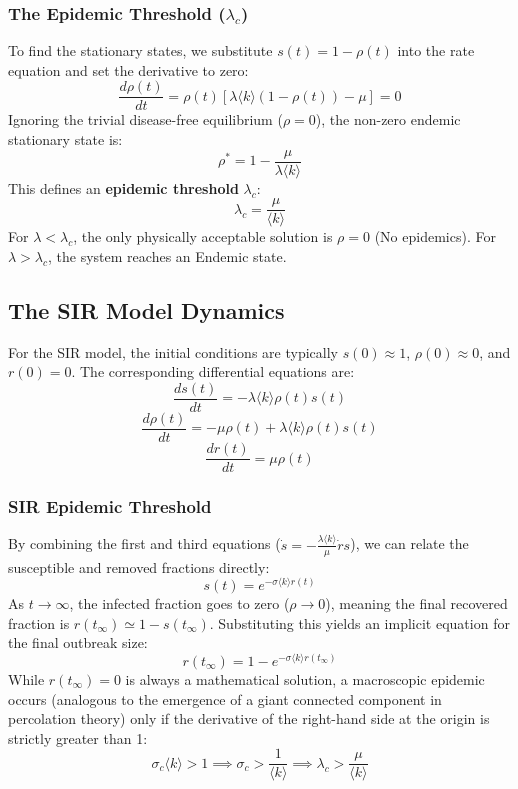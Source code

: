 \subsubsection{The Epidemic Threshold (\(\lambda_c\))}

To find the stationary states, we substitute \(s(t) = 1 - \rho(t)\) into the rate equation and set the derivative to zero:
\[
    \frac{d\rho(t)}{dt} = \rho(t) \left[ \lambda \langle k \rangle (1 - \rho(t)) - \mu \right] = 0
\]
Ignoring the trivial disease-free equilibrium (\(\rho = 0\)), the non-zero endemic stationary state is:
\[
    \rho^* = 1 - \frac{\mu}{\lambda \langle k \rangle}
\]
This defines an \textbf{epidemic threshold} \(\lambda_c\):
\[
    \lambda_c = \frac{\mu}{\langle k \rangle}
\]
For \(\lambda < \lambda_c\), the only physically acceptable solution is \(\rho = 0\) (No epidemics). For \(\lambda > \lambda_c\), the system reaches an Endemic state.

\subsection{The SIR Model Dynamics}
\label{subsec:sir_dynamics}


For the SIR model, the initial conditions are typically \(s(0) \approx 1\), \(\rho(0) \approx 0\), and \(r(0) = 0\). The corresponding differential equations are:
\[
    \frac{ds(t)}{dt} = -\lambda \langle k \rangle \rho(t) s(t)
\]
\[
    \frac{d\rho(t)}{dt} = -\mu \rho(t) + \lambda \langle k \rangle \rho(t) s(t)
\]
\[
    \frac{dr(t)}{dt} = \mu \rho(t)
\]

\subsubsection{SIR Epidemic Threshold}

By combining the first and third equations (\(\dot{s} = -\frac{\lambda \langle k \rangle}{\mu} \dot{r} s\)), we can relate the susceptible and removed fractions directly:
\[
    s(t) = e^{-\sigma \langle k \rangle r(t)}
\]
As \(t \to \infty\), the infected fraction goes to zero (\(\rho \to 0\)), meaning the final recovered fraction is \(r(t_\infty) \simeq 1 - s(t_\infty)\). Substituting this yields an implicit equation for the final outbreak size:
\[
    r(t_\infty) = 1 - e^{-\sigma \langle k \rangle r(t_\infty)}
\]
While \(r(t_\infty) = 0\) is always a mathematical solution, a macroscopic epidemic occurs (analogous to the emergence of a giant connected component in percolation theory) only if the derivative of the right-hand side at the origin is strictly greater than 1:
\[
    \sigma_c \langle k \rangle > 1 \implies \sigma_c > \frac{1}{\langle k \rangle} \implies \lambda_c > \frac{\mu}{\langle k \rangle}
\]

